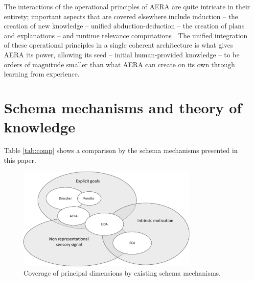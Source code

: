 \documentclass[runningheads]{llncs}
\begin{document}
The interactions of the operational principles of AERA are quite intricate in their entirety; important aspects that are covered elsewhere include induction – the creation of new knowledge – unified abduction-deduction – the creation of plans and explanations – and runtime relevance computations \cite{nivel2013towards}. The unified integration of these operational principles in a single coherent architecture is what gives AERA its power, allowing its seed – initial human-provided knowledge – to be orders of magnitude smaller than what AERA can create on its own through learning from experience. 






\section{Schema mechanisms and theory of knowledge}

Table \ref{tab:comp} shows a comparison by the schema mechanisms presented in this paper.


\begin{figure}
	\centering
	\includegraphics[width=0.8\textwidth]{Figure_venn.pdf}
	\caption{Coverage of principal dimensions by existing schema mechanisms.} 
	\label{fig:venn}
\end{figure}
\end{document}

